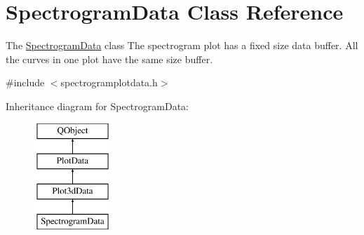 \hypertarget{class_spectrogram_data}{\section{Spectrogram\-Data Class Reference}
\label{class_spectrogram_data}
}


The \hyperlink{class_spectrogram_data}{Spectrogram\-Data} class The spectrogram plot has a fixed size data buffer. All the curves in one plot have the same size buffer.  




{\ttfamily \#include $<$spectrogramplotdata.\-h$>$}

Inheritance diagram for Spectrogram\-Data\-:\begin{figure}[H]
\begin{center}
\leavevmode
\includegraphics[height=4.000000cm]{class_spectrogram_data}
\end{center}
\end{figure}
